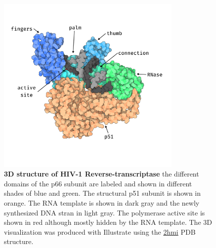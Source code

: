 \documentclass[
  11pt,
  twoside]{scrbook}
\newcommand{\extcaption}[2]{
    \caption[#1]{
        \textbf{#1}\newline
        #2
    }
}
\begin{document}
\begin{figure}[H]
\centering
\includegraphics[width=0.8\textwidth]{./figures/HIV-Intro/rt.png}
\extcaption{3D structure of HIV-1 Reverse-transcriptase}{the different domains of the p66 subunit are labeled and shown in different shades of blue and green. The structural p51 subunit is shown in orange. The RNA template is shown in dark gray and the newly synthesized DNA stran in light gray. The polymerase active site is shown in red although mostly hidden by the RNA template. The 3D visualization was produced with Illustrate \autocite{goodsellIllustrateSoftwareBiomolecular2019} using the \href{https://www.rcsb.org/structure/2HMI}{2hmi} PDB structure.}
\label{fig:rtStruct}
\end{figure}
\end{document}

